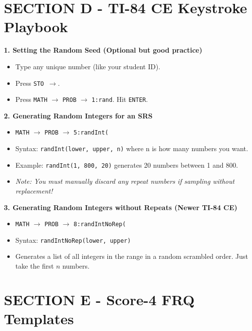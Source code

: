 \section{SECTION D - TI-84 CE Keystroke Playbook}
\begin{calculatorbox}
\textbf{1. Setting the Random Seed (Optional but good practice)}
\begin{itemize}
    \item Type any unique number (like your student ID).
    \item Press \texttt{STO $\rightarrow$}.
    \item Press \texttt{MATH} $\rightarrow$ \texttt{PROB} $\rightarrow$ \texttt{1:rand}. Hit \texttt{ENTER}.
\end{itemize}

\textbf{2. Generating Random Integers for an SRS}
\begin{itemize}
    \item \texttt{MATH} $\rightarrow$ \texttt{PROB} $\rightarrow$ \texttt{5:randInt(}
    \item Syntax: \texttt{randInt(lower, upper, n)} where n is how many numbers you want.
    \item Example: \texttt{randInt(1, 800, 20)} generates 20 numbers between 1 and 800.
    \item \textit{Note: You must manually discard any repeat numbers if sampling without replacement!}
\end{itemize}

\textbf{3. Generating Random Integers without Repeats (Newer TI-84 CE)}
\begin{itemize}
    \item \texttt{MATH} $\rightarrow$ \texttt{PROB} $\rightarrow$ \texttt{8:randIntNoRep(}
    \item Syntax: \texttt{randIntNoRep(lower, upper)}
    \item Generates a list of all integers in the range in a random scrambled order. Just take the first $n$ numbers.
\end{itemize}
\end{calculatorbox}

\section{SECTION E - Score-4 FRQ Templates}

